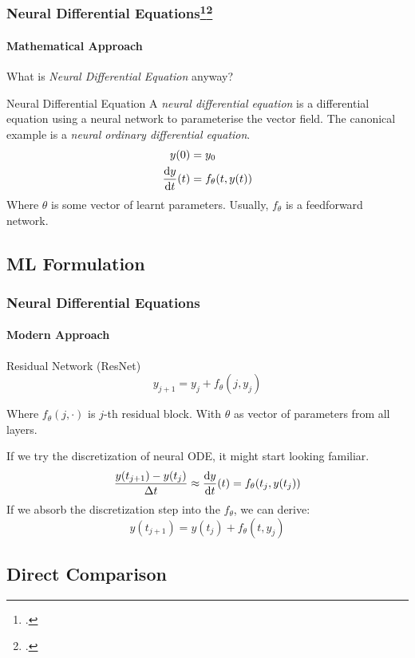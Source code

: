 \documentclass[
    11pt, %
    aspectratio=169, ]{beamer}%
\begin{document}
\begin{frame}
    \frametitle{Neural Differential Equations\footcite{chenNeuralOrdinaryDifferential2019}\footcite{kidgerNeuralDifferentialEquations2022}}
    \framesubtitle{Mathematical Approach}
    What is \textit{Neural Differential Equation} anyway?
    \begin{block}{Neural Differential Equation}
        A \textit{neural differential equation} is a differential equation using a neural
        network to parameterise the vector field. The canonical example is a \textit{neural
            ordinary differential equation}.
        \begin{align}
            y(0) & = y_0 \\ \odv{y}{t}(t) &= f_\theta(t, y(t))
        \end{align}
        Where \(\theta\) is some vector of learnt parameters. Usually, \(f_\theta\) is a feedforward network.
    \end{block}
\end{frame}

\subsection{ML Formulation}

\begin{frame}
    \frametitle{Neural Differential Equations}
    \framesubtitle{Modern Approach}
    \begin{block}{Residual Network (ResNet)}
        \begin{equation}
            y_{j+1} = y_j + f_\theta(j, y_j)
        \end{equation}

        Where \(f_\theta(j, \cdot)\) is \(j\)-th residual block. With \(\theta\) as
        vector of parameters from all layers.
    \end{block}

    If we try the discretization of neural ODE, it might start looking familiar.
    \begin{equation}
        \frac{y(t_{j + 1}) - y(t_j)}{\Delta t} \approx \odv{y}{t}(t) = f_\theta(t_j, y(t_j))
    \end{equation}
    If we absorb the discretization step into the \(f_\theta\), we can derive:
    \begin{equation}
        y(t_{j + 1}) = y(t_j) + f_\theta(t, y_j)
    \end{equation}
\end{frame}
\subsection{Direct Comparison}
\end{document}
